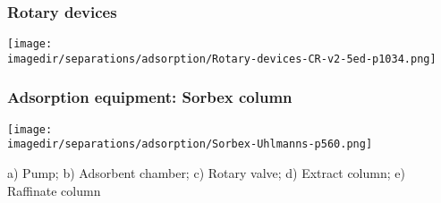 \begin{frame}\frametitle{Rotary devices}
	\begin{center}
		\texttt{[image: \\imagedir/separations/adsorption/Rotary-devices-CR-v2-5ed-p1034.png]}
	\end{center}
	\vspace{-12pt}
\end{frame}

\begin{frame}\frametitle{Adsorption equipment: Sorbex column}
	\begin{center}
		\texttt{[image: \\imagedir/separations/adsorption/Sorbex-Uhlmanns-p560.png]}
	\end{center}

	{\scriptsize a) Pump; b) Adsorbent chamber; c) Rotary valve; d) Extract column; e) Raffinate column}




\end{frame}
